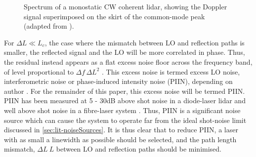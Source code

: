     \begin{figure}[H]
    \centering
    \caption{Spectrum of a monostatic CW coherent lidar, showing the Doppler
    signal superimposed on the skirt of the common-mode peak (adapted from \cite{cariou2006laser}).}
    \label{fig:commonmode}
    \end{figure}
    
    For $\Delta L \ll L_c$, the case where the mismatch between LO and reflection paths is smaller, the reflected signal and the LO will be more correlated in phase.
    Thus, the residual instead appears as a flat excess noise floor across the
    frequency band, of level proportional to $\Delta f\,\Delta L^{2}$
    \cite{harris_role_1998}. This excess noise is termed excess LO noise,
    interferometric noise or phase-induced intensity noise (PIIN), depending on author
    \cite{harris_role_1998,abari_all-fiber_2014,jiang_performance_2019}. For the remainder of this paper, this excess noise will be termed PIIN. PIIN has
    been measured at 5 - 30dB above shot noise in a diode-laser
    lidar \cite{harris_role_1998} and well above shot noise in a fibre-laser
    system \cite{jiang_performance_2019}. Thus, PIIN is a significant noise source which can cause the system to operate far from the ideal shot-noise limit discussed in \autoref{sec:lit-noiseSources}. It is thus clear that to reduce PIIN, a laser with as small a linewidth as possible should be selected, and the path length mismatch, $\Delta L\ L$ between LO and reflection paths should be minimised. 

